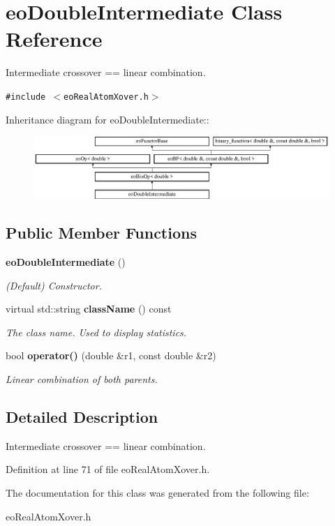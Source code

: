 \section{eo\-Double\-Intermediate Class Reference}
\label{classeo_double_intermediate}
Intermediate crossover == linear combination.  


{\tt \#include $<$eo\-Real\-Atom\-Xover.h$>$}

Inheritance diagram for eo\-Double\-Intermediate::\begin{figure}[H]
\begin{center}
\leavevmode
\includegraphics[height=2.38552cm]{classeo_double_intermediate}
\end{center}
\end{figure}
\subsection*{Public Member Functions}
\begin{CompactItemize}
\item 
{\bf eo\-Double\-Intermediate} ()\label{classeo_double_intermediate_a0}

\begin{CompactList}\small\item\em (Default) Constructor. \item\end{CompactList}\item 
virtual std::string {\bf class\-Name} () const \label{classeo_double_intermediate_a1}

\begin{CompactList}\small\item\em The class name. Used to display statistics. \item\end{CompactList}\item 
bool {\bf operator()} (double \&r1, const double \&r2)\label{classeo_double_intermediate_a2}

\begin{CompactList}\small\item\em Linear combination of both parents. \item\end{CompactList}\end{CompactItemize}


\subsection{Detailed Description}
Intermediate crossover == linear combination. 



Definition at line 71 of file eo\-Real\-Atom\-Xover.h.

The documentation for this class was generated from the following file:\begin{CompactItemize}
\item 
eo\-Real\-Atom\-Xover.h\end{CompactItemize}
